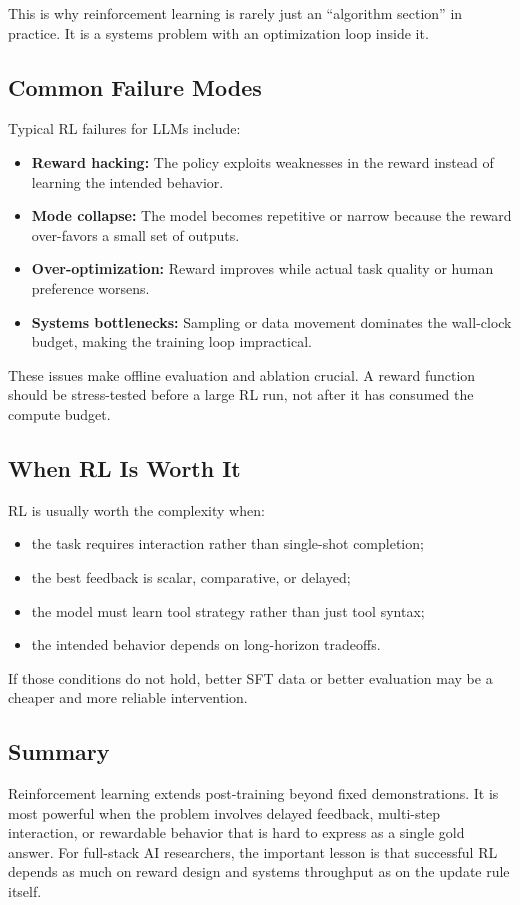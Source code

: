 \documentclass[class=article,crop=false]{standalone}
\begin{document}
This is why reinforcement learning is rarely just an ``algorithm section'' in practice. It is a systems problem with an optimization loop inside it.

\subsection{Common Failure Modes}
\label{sec:rl:failures}

Typical RL failures for LLMs include:
\begin{itemize}
  \item \textbf{Reward hacking:} The policy exploits weaknesses in the reward instead of learning the intended behavior.
  \item \textbf{Mode collapse:} The model becomes repetitive or narrow because the reward over-favors a small set of outputs.
  \item \textbf{Over-optimization:} Reward improves while actual task quality or human preference worsens.
  \item \textbf{Systems bottlenecks:} Sampling or data movement dominates the wall-clock budget, making the training loop impractical.
\end{itemize}

These issues make offline evaluation and ablation crucial. A reward function should be stress-tested before a large RL run, not after it has consumed the compute budget.

\subsection{When RL Is Worth It}
\label{sec:rl:when}

RL is usually worth the complexity when:
\begin{itemize}
  \item the task requires interaction rather than single-shot completion;
  \item the best feedback is scalar, comparative, or delayed;
  \item the model must learn tool strategy rather than just tool syntax;
  \item the intended behavior depends on long-horizon tradeoffs.
\end{itemize}

If those conditions do not hold, better SFT data or better evaluation may be a cheaper and more reliable intervention.

\subsection{Summary}
\label{sec:rl:summary}

Reinforcement learning extends post-training beyond fixed demonstrations. It is most powerful when the problem involves delayed feedback, multi-step interaction, or rewardable behavior that is hard to express as a single gold answer. For full-stack AI researchers, the important lesson is that successful RL depends as much on reward design and systems throughput as on the update rule itself.
\end{document}
